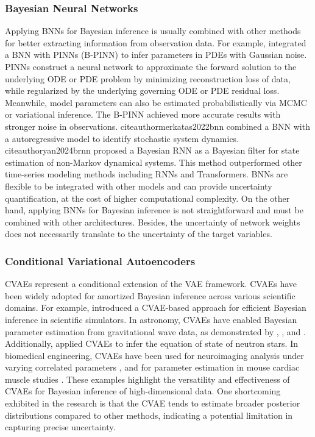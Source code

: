 \subsubsection{Bayesian Neural Networks}
Applying \acfp{BNN} for Bayesian inference is usually combined with other methods for better extracting information from observation data. For example, \citeauthor{YANG2021109913} \citeyearpar{YANG2021109913} integrated a \ac{BNN} with \acfp{PINN} (B-PINN) to infer parameters in \acfp{PDE} with Gaussian noise. \acp{PINN} construct a neural network to approximate the forward solution to the underlying \ac{ODE} or \ac{PDE} problem by minimizing reconstruction loss of data, while regularized by the underlying governing \ac{ODE} or \ac{PDE} residual loss. Meanwhile, model parameters can also be estimated probabilistically via \ac{MCMC} or variational inference. The B-PINN achieved more accurate results with stronger noise in observations. citeauthor{merkatas2022bnn} \citeyearpar{merkatas2022bnn} combined a \ac{BNN} with a autoregressive model to identify stochastic system dynamics. citeauthor{yan2024brnn} \citeyearpar{yan2024brnn} proposed a Bayesian \ac{RNN} as a Bayesian filter for state estimation of non-Markov dynamical systems. This method outperformed other time-series modeling methods including \acp{RNN} and Transformers. \acp{BNN} are flexible to be integrated with other models and can provide uncertainty quantification, at the cost of higher computational complexity. On the other hand, applying \acp{BNN} for Bayesian inference is not straightforward and must be combined with other architectures. Besides, the uncertainty of network weights does not necessarily translate to the uncertainty of the target variables.

\subsubsection{Conditional Variational Autoencoders}
\acfp{CVAE} represent a conditional extension of the \acf{VAE} framework. \acp{CVAE} have been widely adopted for amortized Bayesian inference across various scientific domains. For example, \citeauthor{vae_sbi} \citeyearpar{vae_sbi} introduced a \ac{CVAE}-based approach for efficient Bayesian inference in scientific simulators.
In astronomy, \acp{CVAE} have enabled Bayesian parameter estimation from gravitational wave data, as demonstrated by \citeauthor{Yamamoto_2020rse} \citeyearpar{Yamamoto_2020rse}, \citeauthor{Gabbard2022} \citeyearpar{Gabbard2022}, and \citeauthor{Sun_2025} \citeyearpar{Sun_2025}. Additionally, \citeauthor{Ferreira_2025} \citeyearpar{Ferreira_2025} applied \acp{CVAE} to infer the equation of state of neutron stars. In biomedical engineering, \acp{CVAE} have been used for neuroimaging analysis under varying correlated parameters \citeyearpar{cvae2025}, and for parameter estimation in mouse cardiac muscle studies \citeyearpar{TUNE2025179}. These examples highlight the versatility and effectiveness of \acp{CVAE} for Bayesian inference of high-dimensional data. One shortcoming exhibited in the research \citep{Sun_2025} is that the \ac{CVAE} tends to estimate broader posterior distributions compared to other methods, indicating a potential limitation in capturing precise uncertainty.

